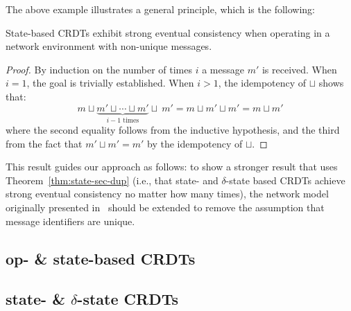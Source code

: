 The above example illustrates a general principle, which is the following:
\begin{theorem} \label{thm:state-sec-dup}
  State-based CRDTs exhibit strong eventual consistency when operating in a
  network environment with non-unique messages.
\end{theorem}
\begin{proof}
  By induction on the number of times $i$ a message $m'$ is received. When $i =
  1$, the goal is trivially established. When $i > 1$, the idempotency of
  $\sqcup$ shows that:
  \[
    m \sqcup \underbrace{m' \sqcup \cdots \sqcup m'}_{\text{$i-1$ times}} \sqcup~m'
      = m \sqcup m' \sqcup m'
      = m \sqcup m'
  \]
  where the second equality follows from the inductive hypothesis, and the third
  from the fact that $m' \sqcup m' = m'$ by the idempotency of $\sqcup$.
\end{proof}

This result guides our approach as follows: to show a stronger result that uses
Theorem~\ref{thm:state-sec-dup} (i.e., that state- and $\delta$-state based
CRDTs achieve strong eventual consistency no matter how many times), the network
model originally presented in~\citep{gomes17} should be extended to remove the
assumption that message identifiers are unique.

\subsection{op- \& state-based CRDTs}
\subsection{state- \& $\delta$-state CRDTs}
